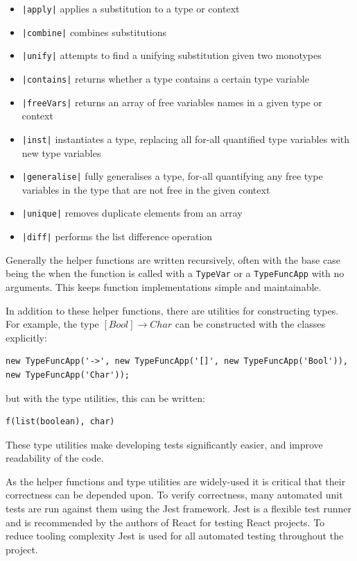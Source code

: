 \documentclass[a4paper,fleqn,oneside,12pt]{report}
\begin{document}
\begin{itemize}
  \item \texttt{|apply|} applies a substitution to a type or context
  \item \texttt{|combine|} combines substitutions
  \item \texttt{|unify|} attempts to find a unifying substitution given two monotypes
  \item \texttt{|contains|} returns whether a type contains a certain type variable
  \item \texttt{|freeVars|} returns an array of free variables names in a given type or context
  \item \texttt{|inst|} instantiates a type, replacing all for-all quantified type variables with new type variables
  \item \texttt{|generalise|} fully generalises a type, for-all quantifying any free type variables in the type that are not free in the given context
  \item \texttt{|unique|} removes duplicate elements from an array
  \item \texttt{|diff|} performs the list difference operation
\end{itemize}

Generally the helper functions are written recursively, often with the base case being the when the function is called with a \texttt{TypeVar} or a \texttt{TypeFuncApp} with no arguments. This keeps function implementations simple and maintainable.

In addition to these helper functions, there are utilities for constructing types. For example, the type $[Bool] \rightarrow Char$ can be constructed with the classes explicitly:

\begin{verbatim}
new TypeFuncApp('->', new TypeFuncApp('[]', new TypeFuncApp('Bool')), new TypeFuncApp('Char'));
\end{verbatim}
but with the type utilities, this can be written:

\begin{verbatim}
f(list(boolean), char)
\end{verbatim}
These type utilities make developing tests significantly easier, and improve readability of the code.

As the helper functions and type utilities are widely-used it is critical that their correctness can be depended upon. To verify correctness, many automated unit tests are run against them using the Jest framework. Jest is a flexible test runner and is recommended by the authors of React for testing React projects. To reduce tooling complexity Jest is used for all automated testing throughout the project.
\end{document}
